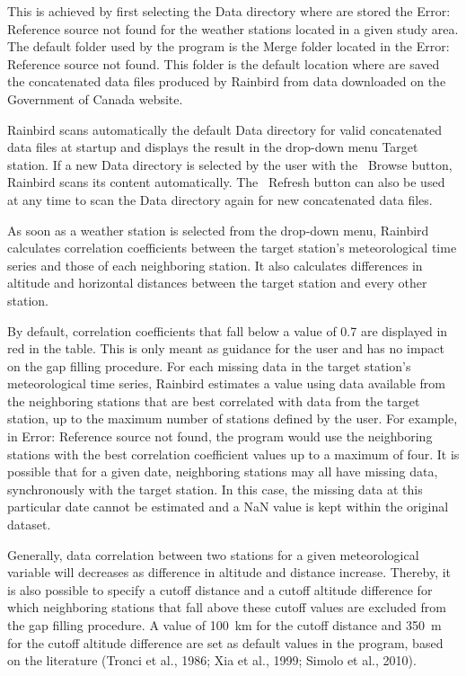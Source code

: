 \documentclass[12pt, letterpaper, fleqn]{report}
\begin{document}
This is achieved by first selecting the Data directory where are stored the Error: Reference source not found for the weather stations located in a given study area. The default folder used by the program is the Merge folder located in the Error: Reference source not found. This folder is the default location where are saved the concatenated data files produced by Rainbird from data downloaded on the Government of Canada website.

Rainbird scans automatically the default Data directory for valid concatenated data files at startup and displays the result in the drop-down menu Target station. If a new Data directory is selected by the user with the  Browse button, Rainbird scans its content automatically. The  Refresh button can also be used at any time to scan the Data directory again for new concatenated data files.

As soon as a weather station is selected from the drop-down menu, Rainbird calculates correlation coefficients between the target station's meteorological time series and those of each neighboring station. It also calculates differences in altitude and horizontal distances between the target station and every other station.

By default, correlation coefficients that fall below a value of 0.7 are displayed in red in the table. This is only meant as guidance for the user and has no impact on the gap filling procedure. For each missing data in the target station's meteorological time series, Rainbird estimates a value using data available from the neighboring stations that are best correlated with data from the target station, up to the maximum number of stations defined by the user. For example, in Error: Reference source not found, the program would use the neighboring stations with the best correlation coefficient values up to a maximum of four. It is possible that for a given date, neighboring stations may all have missing data, synchronously with the target station. In this case, the missing data at this particular date cannot be estimated and a NaN value is kept within the original dataset.

Generally, data correlation between two stations for a given meteorological variable will decreases as difference in altitude and distance increase. Thereby, it is also possible to specify a cutoff distance and a cutoff altitude difference for which neighboring stations that fall above these cutoff values are excluded from the gap filling procedure. A value of 100 km for the cutoff distance and 350 m for the cutoff altitude difference are set as default values in the program, based on the literature (Tronci et al., 1986; Xia et al., 1999; Simolo et al., 2010).
\end{document}
